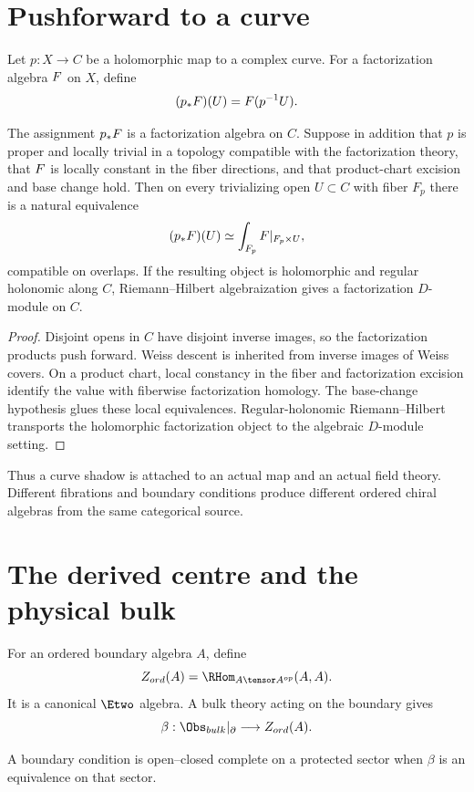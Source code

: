 \chapter{Pushforward to a curve}
Let $p:X\to C$ be a holomorphic map to a complex curve. For a factorization algebra $F$ on $X$, define
\[
 (p_*F)(U)=F(p^{-1}U).
\]

\begin{theorem}
The assignment $p_*F$ is a factorization algebra on $C$. Suppose in addition that $p$ is proper and locally trivial in a topology compatible with the factorization theory, that $F$ is locally constant in the fiber directions, and that product-chart excision and base change hold. Then on every trivializing open $U\subset C$ with fiber $F_p$ there is a natural equivalence
\[
 (p_*F)(U)\simeq
 \int_{F_p}F|_{F_p\times U},
\]
compatible on overlaps. If the resulting object is holomorphic and regular holonomic along $C$, Riemann--Hilbert algebraization gives a factorization $D$-module on $C$.
\end{theorem}
\begin{proof}
Disjoint opens in $C$ have disjoint inverse images, so the factorization products push forward. Weiss descent is inherited from inverse images of Weiss covers. On a product chart, local constancy in the fiber and factorization excision identify the value with fiberwise factorization homology. The base-change hypothesis glues these local equivalences. Regular-holonomic Riemann--Hilbert transports the holomorphic factorization object to the algebraic $D$-module setting.
\end{proof}

Thus a curve shadow is attached to an actual map and an actual field theory. Different fibrations and boundary conditions produce different ordered chiral algebras from the same categorical source.

\chapter{The derived centre and the physical bulk}
For an ordered boundary algebra $A$, define
\[
 Z_{\ord}(A)=\RHom_{A\tensor A^{\op}}(A,A).
\]
It is a canonical $\Etwo$ algebra. A bulk theory acting on the boundary gives
\[
 \beta:\Obs_{\mathrm{bulk}}|_{\partial}\longrightarrow Z_{\ord}(A).
\]

\begin{definition}
A boundary condition is open--closed complete on a protected sector when $\beta$ is an equivalence on that sector.
\end{definition}

